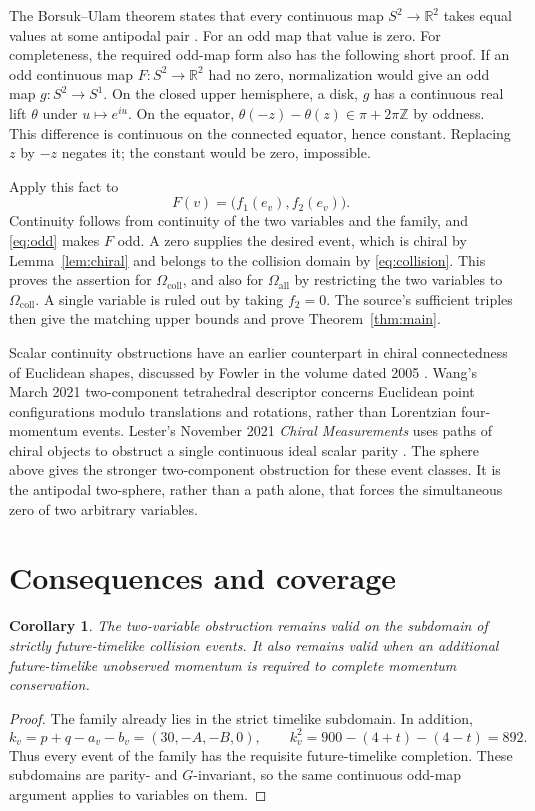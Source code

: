 \documentclass[11pt,a4paper]{article}
\newtheorem{corollary}[theorem]{Corollary}
\newcommand{\RR}{\mathbb R}
\newcommand{\all}{\Omega_{\mathrm{all}}}
\newcommand{\coll}{\Omega_{\mathrm{coll}}}
\begin{document}
The Borsuk--Ulam theorem states that every continuous map
$S^2\to\RR^2$ takes equal values at some antipodal pair
\cite[Satz II, p.~178]{Borsuk}. For an odd map that value is zero.
For completeness, the required odd-map form also has the following
short proof. If an odd continuous map $F:S^2\to\RR^2$ had no zero,
normalization would give an odd map $g:S^2\to S^1$. On the closed
upper hemisphere, a disk, $g$ has a continuous real lift $\theta$ under
$u\mapsto e^{iu}$. On the equator,
$\theta(-z)-\theta(z)\in\pi+2\pi\mathbb Z$ by oddness.
This difference is continuous on the connected equator, hence constant.
Replacing $z$ by $-z$ negates it; the constant would be zero, impossible.

Apply this fact to
\[
 F(v)=\bigl(f_1(e_v),f_2(e_v)\bigr).
\]
Continuity follows from continuity of the two variables and the family,
and \eqref{eq:odd} makes $F$ odd. A zero supplies the desired event,
which is chiral by Lemma~\ref{lem:chiral} and belongs to the collision
domain by \eqref{eq:collision}. This proves the assertion for
$\coll$, and also for $\all$ by restricting the two variables to
$\coll$. A single variable is ruled out by taking $f_2=0$.
The source's sufficient triples then give the matching upper bounds
and prove Theorem~\ref{thm:main}.

Scalar continuity obstructions have an earlier counterpart in chiral
connectedness of Euclidean shapes, discussed by Fowler in the volume
dated 2005 \cite{Fowler}. Wang's March 2021 two-component tetrahedral
descriptor \cite{Wang} concerns Euclidean point configurations modulo
translations and rotations, rather than Lorentzian four-momentum events.
Lester's November 2021 \emph{Chiral Measurements} uses paths of chiral
objects to obstruct a single continuous ideal scalar parity
\cite[\S3.3, Lemma 3.8]{Lester}. The sphere above gives the stronger
two-component obstruction for these event classes. It is the antipodal
two-sphere, rather than a path alone, that forces the simultaneous zero
of two arbitrary variables.

\section{Consequences and coverage}

\begin{corollary}\label{cor:strict}
The two-variable obstruction remains valid on the subdomain of
strictly future-timelike collision events. It also remains valid when
an additional future-timelike unobserved momentum is required to
complete momentum conservation.
\end{corollary}
\begin{proof}
The family already lies in the strict timelike subdomain. In addition,
\[
 k_v=p+q-a_v-b_v=(30,-A,-B,0),\qquad k_v^2=900-(4+t)-(4-t)=892.
\]
Thus every event of the family has the requisite future-timelike
completion. These subdomains are parity- and $G$-invariant, so the
same continuous odd-map argument applies to variables on them.
\end{proof}
\end{document}

